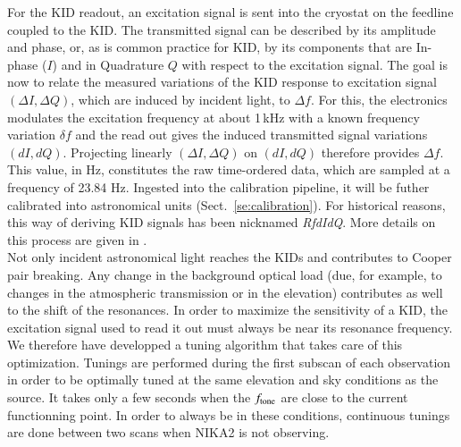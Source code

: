 For the KID readout, an excitation signal is sent into the cryostat on the
feedline coupled to the KID. The transmitted signal can be described by its
amplitude and phase, or, as is common practice for KID, by its components that
are In-phase ($I$) and in Quadrature $Q$ with respect to the excitation
signal. The goal is now to relate the measured variations of the KID response
to excitation signal $(\Delta I, \Delta Q)$, which are induced by incident light, to
$\Delta f$. For this, the electronics modulates the excitation
frequency at about 1\,kHz with a known frequency variation $\delta f$
and the read out gives the induced transmitted signal variations
$(dI, dQ)$. Projecting linearly
$(\Delta I, \Delta Q)$ on $(dI, dQ)$ therefore
provides $\Delta f$. This value, in Hz, constitutes the raw
time-ordered data, which are sampled at a frequency of 23.84
Hz. Ingested into the calibration pipeline, it will be futher calibrated into astronomical units
(Sect.~\ref{se:calibration}). For historical reasons, this way of deriving KID
signals has been nicknamed \emph{RfdIdQ}. More details on this process are given
in \cite{Calvo13}.\\

Not only incident astronomical light reaches the KIDs and contributes to Cooper
pair breaking. Any change in the background optical load (due, for example, to changes in
the atmospheric transmission or in the elevation) contributes as well to the
shift of the resonances. In order to maximize the sensitivity of a KID, the
excitation signal used to read it out must always be near its resonance
frequency. We therefore have developped a tuning algorithm that takes care of
this optimization. Tunings are performed during the first subscan of each
observation in order to be optimally tuned at the same elevation and sky
conditions as the source. It takes only a few seconds when the $f_{\rm{tone}}$ are
close to the current functionning point. In order to always be in these
conditions, continuous tunings are done between two scans when NIKA2 is not observing.


